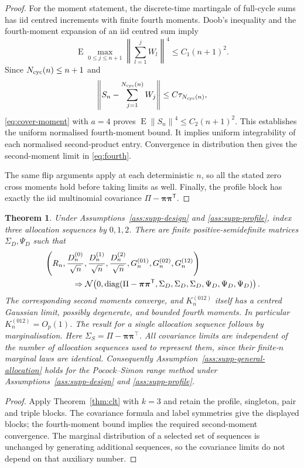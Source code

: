 \documentclass[12pt,a4paper]{article}
\newtheorem{theorem}{Theorem}
\theoremstyle{definition}
\theoremstyle{remark}\newtheorem{remark}{Remark}
\numberwithin{equation}{section}
\newcommand{\E}{\operatorname{E}}
\newcommand{\diag}{\operatorname{diag}}
\newcommand{\norm}[1]{\left\lVert#1\right\rVert}
\newcommand{\trans}{^{\mathsf T}}
\begin{document}
\begin{proof}
For the moment statement, the discrete-time martingale of full-cycle sums has iid centred increments with finite fourth moments. Doob's inequality and the fourth-moment expansion of an iid centred sum imply
\[
 \E\max_{0\le j\le n+1}\norm{\sum_{l=1}^jW_l}^4\le C_1(n+1)^2.
\]
Since $N_{\rm cyc}(n)\le n+1$ and
\[
 \norm{S_n-\sum_{j=1}^{N_{\rm cyc}(n)}W_j}\le C\tau_{N_{\rm cyc}(n)},
\]
\eqref{eq:cover-moment} with $a=4$ proves $\E\norm{S_n}^4\le C_2(n+1)^2$. This establishes the uniform normalised fourth-moment bound. It implies uniform integrability of each normalised second-product entry. Convergence in distribution then gives the second-moment limit in \eqref{eq:fourth}.

The same flip arguments apply at each deterministic $n$, so all the stated zero cross moments hold before taking limits as well. Finally, the profile block has exactly the iid multinomial covariance $\Pi-\bm\pi\bm\pi\trans$.
\end{proof}

\begin{theorem}\label{prop:supp-allocation-clt}
Under Assumptions~\ref{ass:supp-design} and \ref{ass:supp-profile}, index three allocation sequences by $0,1,2$. There are finite positive-semidefinite matrices $\Sigma_D,\Psi_D$ such that
\begin{align*}
 &\left(R_n,\frac{D_n^{(0)}}{\sqrt n},\frac{D_n^{(1)}}{\sqrt n},
 \frac{D_n^{(2)}}{\sqrt n},G_n^{(01)},G_n^{(02)},G_n^{(12)}\right)\\
 &\hspace{12mm}\Rightarrow
 \mathcal N\!\left(0,
 \diag(\Pi-\bm\pi\bm\pi\trans,
 \Sigma_D,\Sigma_D,\Sigma_D,\Psi_D,\Psi_D,\Psi_D)\right).
\end{align*}
The corresponding second moments converge, and $K_n^{(012)}$ itself has a centred Gaussian limit, possibly degenerate, and bounded fourth moments. In particular $K_n^{(012)}=O_p(1)$. The result for a single allocation sequence follows by marginalisation. Here $\Sigma_S=\Pi-\bm\pi\bm\pi^\top$. All covariance limits are independent of the number of allocation sequences used to represent them, since their finite-$n$ marginal laws are identical. Consequently Assumption~\ref{ass:supp-general-allocation} holds for the Pocock--Simon range method under Assumptions~\ref{ass:supp-design} and \ref{ass:supp-profile}.
\end{theorem}
\begin{proof}
Apply Theorem~\ref{thm:clt} with $k=3$ and retain the profile, singleton, pair and triple blocks. The covariance formula and label symmetries give the displayed blocks; the fourth-moment bound implies the required second-moment convergence. The marginal distribution of a selected set of sequences is unchanged by generating additional sequences, so the covariance limits do not depend on that auxiliary number.
\end{proof}
\end{document}
